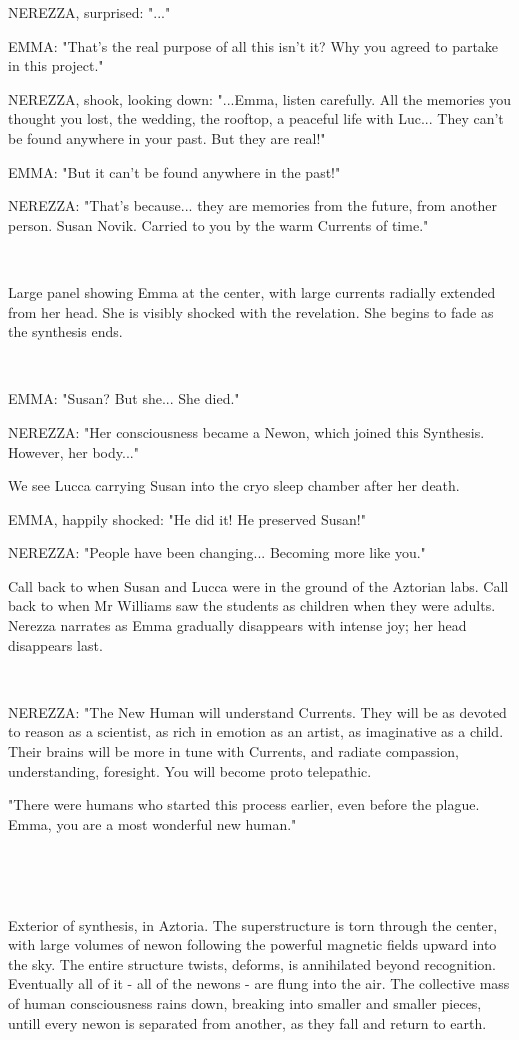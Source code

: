 \documentclass[11pt]{article}
\begin{document}
NEREZZA, surprised: "..."

EMMA: "That's the real purpose of all this isn't it?
Why you agreed to partake in this project."

NEREZZA, shook, looking down: "...Emma, listen carefully.
All the memories you thought you lost, the wedding, the rooftop, a peaceful life with Luc... They can't be found anywhere in your past. 
But they are real!"

EMMA: "But it can't be found anywhere in the past!"

NEREZZA: "That's because... they are memories from the future, from another person.
Susan Novik.
Carried to you by the warm Currents of time."

\ 

Large panel showing Emma at the center, with large currents radially extended from her head.
She is visibly shocked with the revelation.
She begins to fade as the synthesis ends. 

\ 

EMMA: "Susan? But she... She died."

NEREZZA: "Her consciousness became a Newon, which joined this Synthesis.
However, her body..."

We see Lucca carrying Susan into the cryo sleep chamber after her death.

EMMA, happily shocked: "He did it! 
He preserved Susan!"

NEREZZA: "People have been changing...
Becoming more like you."

Call back to when Susan and Lucca were in the ground of the Aztorian labs.
Call back to when Mr Williams saw the students as children when they were adults.
Nerezza narrates as Emma gradually disappears with intense joy; her head disappears last.

\ 

NEREZZA: "The New Human will understand Currents. 
They will be as devoted to reason as a scientist, as rich in emotion as an artist, as imaginative as a child.
Their brains will be more in tune with Currents, and radiate compassion, understanding, foresight.
You will become proto telepathic.

"There were humans who started this process earlier, even before the plague.
Emma, you are a most wonderful new human."

\ 

\ 

Exterior of synthesis, in Aztoria.
The superstructure is torn through the center, with large volumes of newon following the powerful magnetic fields upward into the sky. 
The entire structure twists, deforms, is annihilated beyond recognition.
Eventually all of it - all of the newons - are flung into the air.
The collective mass of human consciousness rains down, breaking into smaller and smaller pieces, untill every newon is separated from another, as they fall and return to earth. 
\end{document}
